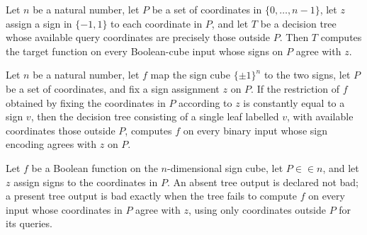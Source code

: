 \begin{definition}
\leanok
{}
Let $n$ be a natural number, let $P$ be a set of coordinates in $\{0,\ldots,n-1\}$, let
$z$ assign a sign in $\{ -1,1 \}$ to each coordinate in $P$, and let $T$ be a decision
tree whose available query coordinates are precisely those outside $P$. Then $T$
computes the target function on every Boolean-cube input whose signs on $P$ agree with
$z$.
\end{definition}

\begin{theorem}
\leanok
{}
Let $n$ be a natural number, let $f$ map the sign cube $\{\pm1\}^n$ to the two signs,
let $P$ be a set of coordinates, and fix a sign assignment $z$ on $P$. If the
restriction of $f$ obtained by fixing the coordinates in $P$ according to $z$ is
constantly equal to a sign $v$, then the decision tree consisting of a single leaf
labelled $v$, with available coordinates those outside $P$, computes $f$ on every binary
input whose sign encoding agrees with $z$ on $P$.
\end{theorem}

\begin{definition}
\label{FABL.JuntaTreeOutputBad}
\leanok
{}
Let $f$ be a Boolean function on the $n$-dimensional sign cube, let $P\in\in n$, and let
$z$ assign signs to the coordinates in $P$. An absent tree output is declared not bad; a
present tree output is bad exactly when the tree fails to compute $f$ on every input
whose coordinates in $P$ agree with $z$, using only coordinates outside $P$ for its
queries.
\end{definition}

